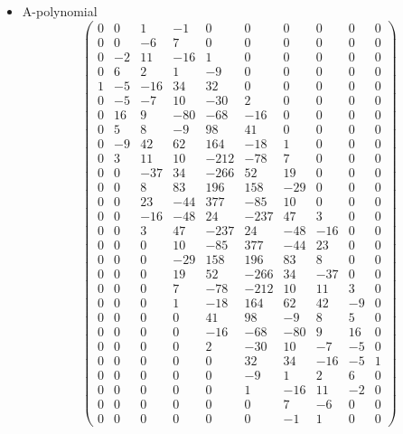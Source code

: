 \documentclass[12pt,reqno]{amsart}
\numberwithin{equation}{section}
\begin{document}
\begin{itemize}
\item A-polynomial
  \begin{equation*}
    \begin{pmatrix}
      0 & 0 & 1 & -1 & 0 & 0 & 0 & 0 & 0 & 0
      \\
      0 & 0 & -6 & 7 & 0 & 0 & 0 & 0 & 0 & 0
      \\
      0 & -2 & 11 & -16 & 1 & 0 & 0 & 0 & 0 & 0
      \\
      0 & 6 & 2 & 1 & -9 & 0 & 0 & 0 & 0 & 0
      \\
      1 & -5 & -16 & 34 & 32 & 0 & 0 & 0 & 0 & 0
      \\
      0 & -5 & -7 & 10 & -30 & 2 & 0 & 0 & 0 & 0
      \\
      0 & 16 & 9 & -80 & -68 & -16 & 0 & 0 & 0 & 0
      \\
      0 & 5 & 8 & -9 & 98 & 41 & 0 & 0 & 0 & 0
      \\
      0 & -9 & 42 & 62 & 164 & -18 & 1 & 0 & 0 & 0
      \\
      0 & 3 & 11 & 10 & -212 & -78 & 7 & 0 & 0 & 0
      \\
      0 & 0 & -37 & 34 & -266 & 52 & 19 & 0 & 0 & 0
      \\
      0 & 0 & 8 & 83 & 196 & 158 & -29 & 0 & 0 & 0
      \\
      0 & 0 & 23 & -44 & 377 & -85 & 10 & 0 & 0 & 0
      \\
      0 & 0 & -16 & -48 & 24 & -237 & 47 & 3 & 0 & 0
      \\
      0 & 0 & 3 & 47 & -237 & 24 & -48 & -16 & 0 & 0
      \\
      0 & 0 & 0 & 10 & -85 & 377 & -44 & 23 & 0 & 0
      \\
      0 & 0 & 0 & -29 & 158 & 196 & 83 & 8 & 0 & 0
      \\
      0 & 0 & 0 & 19 & 52 & -266 & 34 & -37 & 0 & 0
      \\
      0 & 0 & 0 & 7 & -78 & -212 & 10 & 11& 3 & 0
      \\
      0 & 0 & 0 & 1 & -18 & 164 & 62 & 42 & -9 & 0
      \\
      0 & 0 & 0 & 0 & 41 & 98 & -9 & 8 & 5 & 0
      \\
      0 & 0 & 0 & 0 & -16 & -68 & -80 & 9 & 16 & 0
      \\
      0 & 0 & 0 & 0 & 2 & -30 & 10 & -7 & -5 & 0
      \\
      0 & 0 & 0 & 0 & 0 & 32 & 34 & -16 & -5 & 1
      \\
      0 & 0 & 0 & 0 & 0 & -9 & 1 & 2 & 6 & 0
      \\
      0 & 0 & 0 & 0 & 0 & 1 & -16 & 11 & -2 & 0
      \\
      0 & 0 & 0 & 0 & 0 & 0 & 7 & -6 & 0 & 0
      \\
      0 & 0 & 0 & 0 & 0 & 0 & -1 & 1 & 0 & 0
    \end{pmatrix}
  \end{equation*}
\end{itemize}
\end{document}
